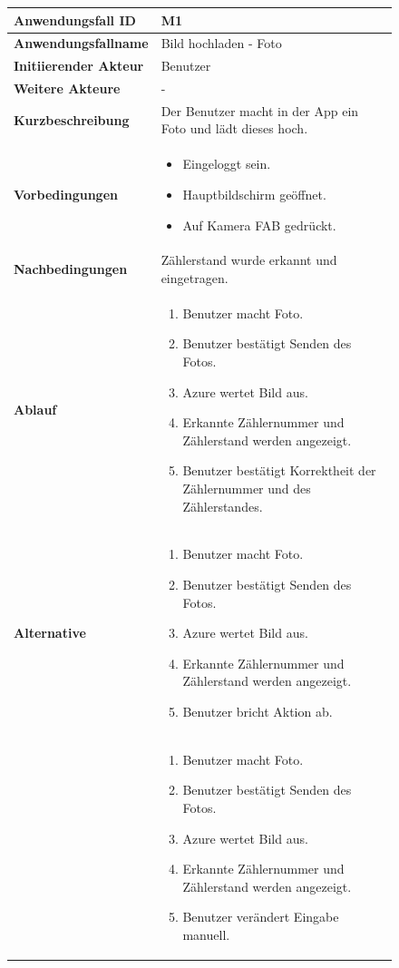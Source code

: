 \newpage

\begin{figure}[h]
	\centering
	\begin{tabularx}{\textwidth}{ X | X }
		\textbf{Anwendungsfall ID} & M1 \\ \hline
		\textbf{Anwendungsfallname} & Bild hochladen  - Foto \\ \hline
		\textbf{Initiierender Akteur} & Benutzer \\ \hline
		\textbf{Weitere Akteure} & - \\ \hline
		\textbf{Kurzbeschreibung} & Der Benutzer macht in der App ein Foto und lädt dieses hoch.   \\ \hline
		\textbf{Vorbedingungen} & 
		\begin {itemize}
			\item Eingeloggt sein. 
			\item Hauptbildschirm geöffnet.
			\item Auf Kamera FAB gedrückt.
		\end{itemize} \\ \hline
		\textbf{Nachbedingungen} & Zählerstand wurde erkannt und eingetragen.  \\ \hline
		\textbf{Ablauf} &
		\begin{enumerate}
			\item Benutzer macht Foto.
			\item Benutzer bestätigt Senden des Fotos.
			\item Azure wertet Bild aus.
			\item Erkannte Zählernummer und Zählerstand werden angezeigt.
			\item Benutzer bestätigt Korrektheit der Zählernummer und des Zählerstandes.
		\end{enumerate} \\ \hline
		\textbf{Alternative} &
		\begin{enumerate}
			\item Benutzer macht Foto.
			\item Benutzer bestätigt Senden des Fotos.
			\item Azure wertet Bild aus.
			\item Erkannte Zählernummer und Zählerstand werden angezeigt.
			\item Benutzer bricht Aktion ab.
		\end{enumerate} \\ &
		\begin{enumerate}
			\item Benutzer macht Foto.
			\item Benutzer bestätigt Senden des Fotos.
			\item Azure wertet Bild aus.
			\item Erkannte Zählernummer und Zählerstand werden angezeigt.
			\item Benutzer verändert Eingabe manuell.
		\end{enumerate} \\


	\end{tabularx}
\end{figure}

